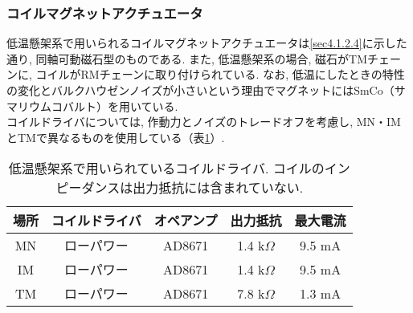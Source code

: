 \subsubsection{コイルマグネットアクチュエータ}
\label{sec4.2.2.3}
\vskip3mm
低温懸架系で用いられるコイルマグネットアクチュエータは\ref{sec4.1.2.4}に示した通り, 同軸可動磁石型のものである. また, 低温懸架系の場合, 磁石がTMチェーンに, コイルがRMチェーンに取り付けられている. なお, 低温にしたときの特性の変化とバルクハウゼンノイズが小さいという理由でマグネットにはSmCo（サマリウムコバルト）を用いている. \\
\quad コイルドライバについては, 作動力とノイズのトレードオフを考慮し, MN・IMとTMで異なるものを使用している（表\ref{table4.4}）. 
\begin{table}[H]
 \centering
  \begin{tabular}{ccccc}
   \hline\hline
   場所 & コイルドライバ & オペアンプ & 出力抵抗      & 最大電流 \\
   \hline
   MN   & ローパワー     & AD8671     & 1.4 k$\Omega$ & 9.5 mA \\
   IM   & ローパワー     & AD8671     & 1.4 k$\Omega$ & 9.5 mA \\
   TM   & ローパワー     & AD8671     & 7.8 k$\Omega$ & 1.3 mA \\
   \hline
  \end{tabular}
 \caption[コイルドライバ（低温懸架系）]{低温懸架系で用いられているコイルドライバ\cite{48}. コイルのインピーダンスは出力抵抗には含まれていない. }
 \label{table4.4}
\end{table}

